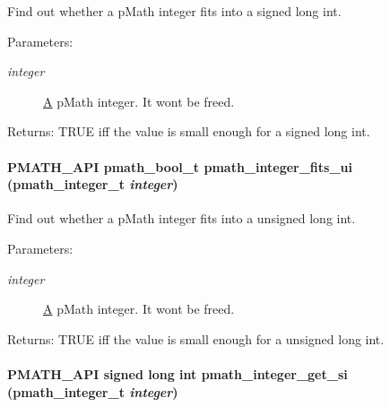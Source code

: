 Find out whether a pMath integer fits into a signed long int. 

\begin{Desc}
\item[Parameters:]
\begin{description}
\item[{\em integer}]\hyperlink{class_a}{A} pMath integer. It wont be freed. \end{description}
\end{Desc}
\begin{Desc}
\item[Returns:]TRUE iff the value is small enough for a signed long int. \end{Desc}
\hypertarget{group__numbers_gb12e5e34b7918cb6beee23c57cdd0d36}{
\paragraph[{pmath\_\-integer\_\-fits\_\-ui}]{\setlength{\rightskip}{0pt plus 5cm}PMATH\_\-API {\bf pmath\_\-bool\_\-t} pmath\_\-integer\_\-fits\_\-ui ({\bf pmath\_\-integer\_\-t} {\em integer})}\hfill}
\label{group__numbers_gb12e5e34b7918cb6beee23c57cdd0d36}


Find out whether a pMath integer fits into a unsigned long int. 

\begin{Desc}
\item[Parameters:]
\begin{description}
\item[{\em integer}]\hyperlink{class_a}{A} pMath integer. It wont be freed. \end{description}
\end{Desc}
\begin{Desc}
\item[Returns:]TRUE iff the value is small enough for a unsigned long int. \end{Desc}
\hypertarget{group__numbers_g12219f6f678ed0ddff66d352e0dabbd1}{
\paragraph[{pmath\_\-integer\_\-get\_\-si}]{\setlength{\rightskip}{0pt plus 5cm}PMATH\_\-API signed long int pmath\_\-integer\_\-get\_\-si ({\bf pmath\_\-integer\_\-t} {\em integer})}\hfill}
\label{group__numbers_g12219f6f678ed0ddff66d352e0dabbd1}


